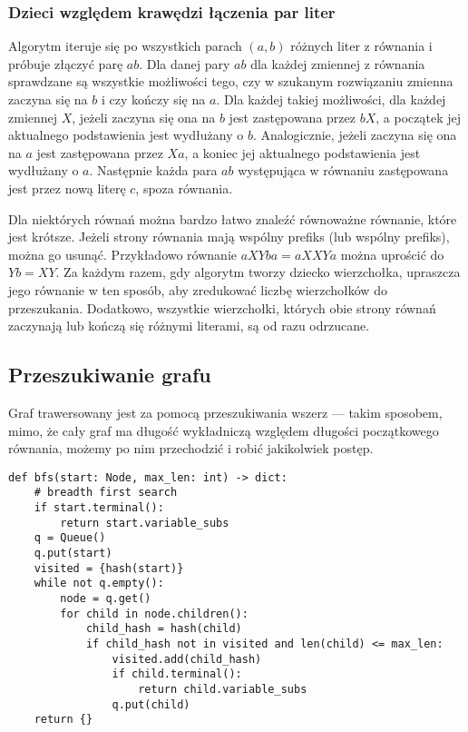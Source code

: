 \documentclass[leqno, 12pt]{article}
\begin{document}
\subsubsection*{Dzieci względem krawędzi łączenia par liter}
Algorytm iteruje się po wszystkich parach $(a, b)$ różnych liter z równania i próbuje złączyć parę $ab$.
Dla danej pary $ab$ dla każdej zmiennej z równania sprawdzane są wszystkie możliwości tego, czy w szukanym rozwiązaniu zmienna zaczyna się na $b$ i czy kończy się na $a$. Dla każdej takiej możliwości, dla każdej zmiennej $X$, jeżeli zaczyna się ona na $b$ jest zastępowana przez $bX$, a początek jej aktualnego podstawienia jest wydłużany o $b$. Analogicznie, jeżeli zaczyna się ona na $a$ jest zastępowana przez $Xa$, a koniec jej aktualnego podstawienia jest wydłużany o $a$. Następnie każda para $ab$ występująca w równaniu zastępowana jest przez nową literę $c$, spoza równania.

Dla niektórych równań można bardzo łatwo znaleźć równoważne równanie, które jest krótsze. Jeżeli strony równania mają wspólny prefiks (lub wspólny prefiks), można go usunąć. Przykładowo równanie $aXYba = aXXYa$ można uprościć do $Yb = XY$. Za każdym razem, gdy algorytm tworzy dziecko wierzchołka, upraszcza jego równanie w ten sposób, aby zredukować liczbę wierzchołków do przeszukania. Dodatkowo, wszystkie wierzchołki, których obie strony równań zaczynają lub kończą się różnymi literami, są od razu odrzucane.

\subsection{Przeszukiwanie grafu}
Graf trawersowany jest za pomocą przeszukiwania wszerz --- takim sposobem, mimo, że cały graf ma długość wykładniczą względem długości początkowego równania, możemy po nim przechodzić i robić jakikolwiek postęp.

\begin{verbatim}
def bfs(start: Node, max_len: int) -> dict:
    # breadth first search
    if start.terminal():
        return start.variable_subs
    q = Queue()
    q.put(start)
    visited = {hash(start)}
    while not q.empty():
        node = q.get()
        for child in node.children():
            child_hash = hash(child)
            if child_hash not in visited and len(child) <= max_len:
                visited.add(child_hash)
                if child.terminal():
                    return child.variable_subs
                q.put(child)
    return {}
\end{verbatim}
\end{document}
